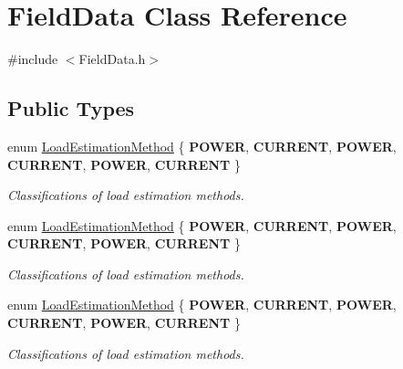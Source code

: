 \hypertarget{class_field_data}{}\section{Field\+Data Class Reference}
\label{class_field_data}


{\ttfamily \#include $<$Field\+Data.\+h$>$}

\subsection*{Public Types}
\begin{DoxyCompactItemize}
\item 
\mbox{\label{class_field_data_a424e89914ba5684c01bb269dbe3312fd}} 
enum \hyperlink{class_field_data_a424e89914ba5684c01bb269dbe3312fd}{Load\+Estimation\+Method} \{ \newline
{\bfseries P\+O\+W\+ER}, 
{\bfseries C\+U\+R\+R\+E\+NT}, 
{\bfseries P\+O\+W\+ER}, 
{\bfseries C\+U\+R\+R\+E\+NT}, 
\newline
{\bfseries P\+O\+W\+ER}, 
{\bfseries C\+U\+R\+R\+E\+NT}
 \}\begin{DoxyCompactList}\small\item\em Classifications of load estimation methods. \end{DoxyCompactList}
\item 
\mbox{\label{class_field_data_a424e89914ba5684c01bb269dbe3312fd}} 
enum \hyperlink{class_field_data_a424e89914ba5684c01bb269dbe3312fd}{Load\+Estimation\+Method} \{ \newline
{\bfseries P\+O\+W\+ER}, 
{\bfseries C\+U\+R\+R\+E\+NT}, 
{\bfseries P\+O\+W\+ER}, 
{\bfseries C\+U\+R\+R\+E\+NT}, 
\newline
{\bfseries P\+O\+W\+ER}, 
{\bfseries C\+U\+R\+R\+E\+NT}
 \}\begin{DoxyCompactList}\small\item\em Classifications of load estimation methods. \end{DoxyCompactList}
\item 
\mbox{\label{class_field_data_a424e89914ba5684c01bb269dbe3312fd}} 
enum \hyperlink{class_field_data_a424e89914ba5684c01bb269dbe3312fd}{Load\+Estimation\+Method} \{ \newline
{\bfseries P\+O\+W\+ER}, 
{\bfseries C\+U\+R\+R\+E\+NT}, 
{\bfseries P\+O\+W\+ER}, 
{\bfseries C\+U\+R\+R\+E\+NT}, 
\newline
{\bfseries P\+O\+W\+ER}, 
{\bfseries C\+U\+R\+R\+E\+NT}
 \}\begin{DoxyCompactList}\small\item\em Classifications of load estimation methods. \end{DoxyCompactList}
\end{DoxyCompactItemize}

